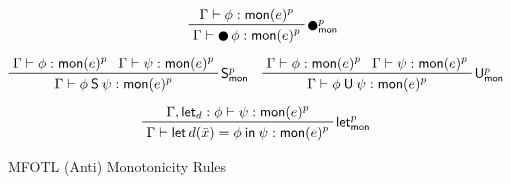 \begin{figure}
\begin{gather*}
        \quad
        \prftree[r]
            {$\Prev^p_\mathsf{mon}$}
            {\Gamma \vdash \phi : \mono{e}^p}
            {\Gamma \vdash \Prev \phi : \mono{e}^p}
        \\[5pt]
        \prftree[r]
            {$\Since^p_\mathsf{mon}$}
            {\Gamma \vdash \phi : \mono{e}^p}
            {\Gamma \vdash \psi : \mono{e}^p}
            {\Gamma \vdash \phi \Since \psi : \mono{e}^p}
        \quad
        \prftree[r]
            {$\UUntil^p_\mathsf{mon}$}
            {\Gamma \vdash \phi : \mono{e}^p}
            {\Gamma \vdash \psi : \mono{e}^p}
            {\Gamma \vdash \phi \UUntil \psi : \mono{e}^p}
        \\[5pt]
        \prftree[r]
            {$\mathsf{let}^p_\mathsf{mon}$}
            {\Gamma, \mathsf{let}_d : \phi \vdash \psi : \mono{e}^p}
            {\Gamma \vdash \LLet{d(\bar{x})}{\phi}{\psi} : \mono{e}^p}
    \end{gather*}
    \vspace{-2em}
    \caption{MFOTL (Anti) Monotonicity Rules \cite[Appendix A]{lex}}
    \label{fig:mfotl-monotonicity}
\end{figure}

